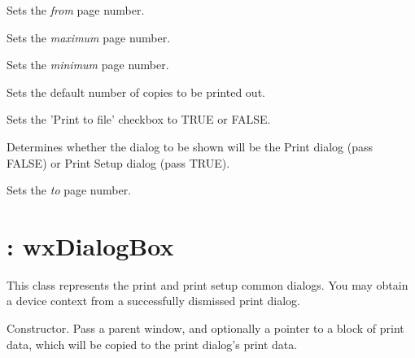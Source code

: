 
Sets the {\it from} page number.



Sets the {\it maximum} page number.



Sets the {\it minimum} page number.



Sets the default number of copies to be printed out.



Sets the 'Print to file' checkbox to TRUE or FALSE.



Determines whether the dialog to be shown will be the Print dialog
(pass FALSE) or Print Setup dialog (pass TRUE).



Sets the {\it to} page number.

\section{: wxDialogBox}\label{wxprintdialog}


This class represents the print and print setup common dialogs.
You may obtain a  device context from
a successfully dismissed print dialog.



Constructor. Pass a parent window, and optionally a pointer to a block of print
data, which will be copied to the print dialog's print data.

